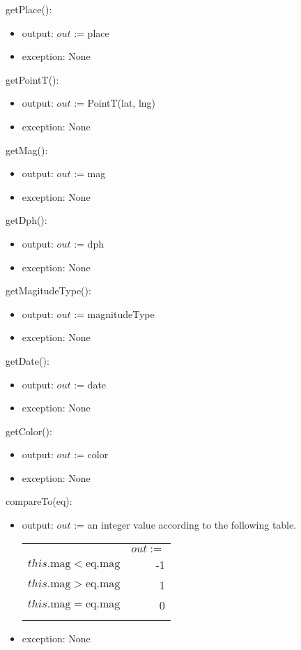 \documentclass[12pt]{article}
\begin{document}
\noindent getPlace():
\begin{itemize}
\item output: $out$ := place
\item exception: None
\end{itemize}

\noindent getPointT():
\begin{itemize}
\item output: $out$ := PointT(lat, lng)
\item exception: None
\end{itemize}

\noindent getMag():
\begin{itemize}
\item output: $out$ := mag
\item exception: None
\end{itemize}

\noindent getDph():
\begin{itemize}
\item output: $out$ := dph
\item exception: None
\end{itemize}

\noindent getMagitudeType():
\begin{itemize}
\item output: $out$ := magnitudeType
\item exception: None
\end{itemize}

\noindent getDate():
\begin{itemize}
\item output: $out$ := date
\item exception: None
\end{itemize}

\noindent getColor():
\begin{itemize}
\item output: $out$ := color
\item exception: None
\end{itemize}

\noindent compareTo(eq):
\begin{itemize}
\item output: $out$ := an integer value according to the following table.\\

\begin{tabular}{|p{4cm}|r|}
\hhline{~|-|}
\multicolumn{1}{r|}{} & \multicolumn{1}{l|}{$out :=$}\\
\hhline{|-|-|}
$this.\mbox{mag} < \mbox{eq.mag}$ & -1 \\
\hhline{|-|-|}
$this.\mbox{mag} > \mbox{eq.mag}$ & 1 \\
\hhline{|-|-|}
$this.\mbox{mag} = \mbox{eq.mag}$ & 0 \\
\hhline{|-|-|}
\end{tabular}

\item exception: None
\end{itemize}
\end{document}
